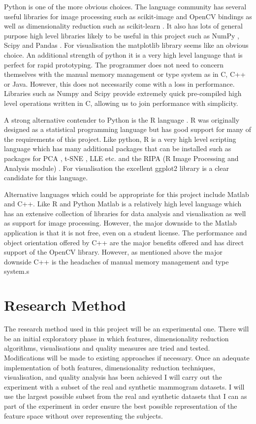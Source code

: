 Python \cite{pythonLanguage} is one of the more obvious choices. The language community has several useful libraries for image processing such as scikit-image \cite{van2014scikit} and OpenCV bindings \cite{openCV} as well as dimensionality reduction such as scikit-learn \cite{pedregosa2011scikit}. It also has lots of general purpose high level libraries likely to be useful in this project such as NumPy \cite{pythonNumpy}, Scipy \cite{pythonSciPy} and Pandas \cite{pythonPandas}. For visualisation the matplotlib library seems like an obvious choice. An additional strength of python it is a very high level language that is perfect for rapid prototyping. The programmer does not need to concern themselves with the manual memory management or type system as in C, C++ or Java. However, this does not necessarily come with a loss in performance. Libraries such as Numpy and Scipy provide extremely quick pre-compiled high level operations written in C, allowing us to join performance with simplicity.

A strong alternative contender to Python is the R language \cite{rlanguage}. R was originally designed as a statistical programming language but has good support for many of the requirements of this project. Like python, R is a very high level scripting language which has many additional packages that can be installed such as packages for PCA \cite{rPCA}, t-SNE \cite{rtSNE}, LLE \cite{rLLE} etc. and the RIPA (R Image Processing and Analysis module) \cite{rRIPA}. For visualisation the excellent ggplot2 \cite{rggplot2} library is a clear candidate for this language.

Alternative languages which could be appropriate for this project include Matlab and C++. Like R and Python Matlab \cite{matlab} is a relatively high level language which has an extensive collection of libraries for data analysis and visualisation as well as support for image processing. However, the major downside to the Matlab application is that it is not free, even on a student license. The performance and object orientation offered by C++ are the major benefits offered and has direct support of the OpenCV library. However, as mentioned above the major downside C++ is the headaches of manual memory management and type system.s 

\section{Research Method}
The research method used in this project will be an experimental one. There will be an initial exploratory phase in which features, dimensionality reduction algorithms, visualisations and quality measures are tried and tested. Modifications will be made to existing approaches if necessary. Once an adequate implementation of both features, dimensionality reduction techniques, visualisation, and quality analysis has been achieved I will carry out the experiment with a subset of the real and synthetic mammogram datasets. I will use the largest possible subset from the real and synthetic datasets that I can as part of the experiment in order ensure the best possible representation of the feature space without over representing the subjects.


